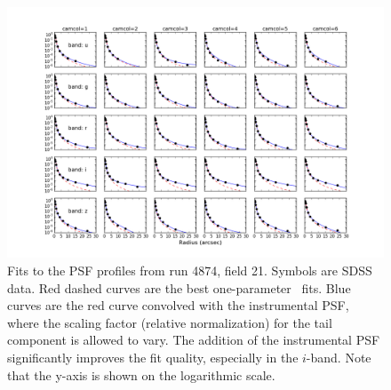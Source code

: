 \begin{figure}[th]
\centering
\includegraphics[width=1.0\textwidth]{FIGURES/psffit.png}
\vskip -0.3in
\caption{Fits to the PSF profiles from run 4874, field 21. Symbols are SDSS data. 
  Red dashed curves are the best one-parameter \vk~fits. Blue curves are the red
  curve convolved with the instrumental PSF, where the scaling factor
  (relative normalization) 
  for the tail component is allowed to vary. The addition of the instrumental PSF 
  significantly improves the fit quality, especially in the $i$-band. Note that the y-axis 
  is shown on the logarithmic scale.
\label{fig:psffit}}
\end{figure}


